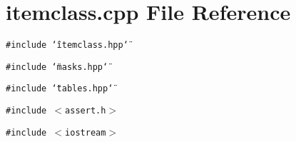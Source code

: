 \section{itemclass.cpp File Reference}
\label{itemclass_8cpp}
{\tt \#include \char`\"{}itemclass.hpp\char`\"{}}\par
{\tt \#include \char`\"{}masks.hpp\char`\"{}}\par
{\tt \#include \char`\"{}tables.hpp\char`\"{}}\par
{\tt \#include $<$assert.h$>$}\par
{\tt \#include $<$iostream$>$}\par
